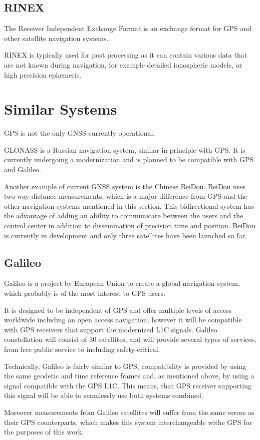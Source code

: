 \subsection{RINEX}

The Receiver Independent Exchange Format \cite{rinex-format} is an exchange format
for GPS and other satellite navigation systems.

RINEX is typically used for post processing as it can contain various data that are not
known during navigation, for example detailed ionospheric models, or high precision ephemeris.

\section{Similar Systems}

GPS is not the only GNSS currently operational.

GLONASS \cite{glonass} is a Russian navigation system, similar in principle with GPS.
It is currently undergoing a modernization and is planned to be compatible with GPS and Galileo.

Another example of current GNSS system is the Chinese BeiDou.
BeiDou uses two way distance measurements, which is a major difference from GPS and the other navigation
systems mentioned in this section.
This bidirectional system has the advantage of adding an ability to communicate between the
users and the control center in addition to dissemination of precision time and position.
BeiDou is currently in development and only three satellites have been launched so far.


\subsection{Galileo}
\label{sec:galileo}

Galileo \cite{galileo} is a project by European Union to create a global navigation system, which
probably is of the most interest to GPS users.

It is designed to be independent of GPS and offer multiple levels of access worldwide
including an open access navigation, however
it will be compatible with GPS receivers that support the modernized L1C signals.
Galileo constellation will consist of 30 satellites, and will provide several types of services,
from free public service to including safety-critical.

Technically, Galileo is fairly similar to GPS,
compatibility is provided by using the same geodetic and time reference frames
and, as mentioned above, by using a signal compatible with the GPS L1C.
This means, that GPS receiver supporting this signal will be able to seamlessly
use both systems combined.

Moreover measurements from Galileo satellites will suffer from the same errors as
their GPS counterparts, which makes this system interchangeable withe GPS for the purposes
of this work.
